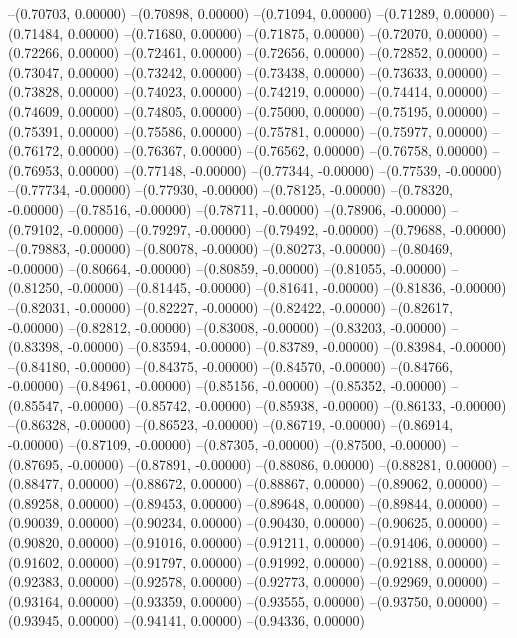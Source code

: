 --(0.70703, 0.00000)
--(0.70898, 0.00000)
--(0.71094, 0.00000)
--(0.71289, 0.00000)
--(0.71484, 0.00000)
--(0.71680, 0.00000)
--(0.71875, 0.00000)
--(0.72070, 0.00000)
--(0.72266, 0.00000)
--(0.72461, 0.00000)
--(0.72656, 0.00000)
--(0.72852, 0.00000)
--(0.73047, 0.00000)
--(0.73242, 0.00000)
--(0.73438, 0.00000)
--(0.73633, 0.00000)
--(0.73828, 0.00000)
--(0.74023, 0.00000)
--(0.74219, 0.00000)
--(0.74414, 0.00000)
--(0.74609, 0.00000)
--(0.74805, 0.00000)
--(0.75000, 0.00000)
--(0.75195, 0.00000)
--(0.75391, 0.00000)
--(0.75586, 0.00000)
--(0.75781, 0.00000)
--(0.75977, 0.00000)
--(0.76172, 0.00000)
--(0.76367, 0.00000)
--(0.76562, 0.00000)
--(0.76758, 0.00000)
--(0.76953, 0.00000)
--(0.77148, -0.00000)
--(0.77344, -0.00000)
--(0.77539, -0.00000)
--(0.77734, -0.00000)
--(0.77930, -0.00000)
--(0.78125, -0.00000)
--(0.78320, -0.00000)
--(0.78516, -0.00000)
--(0.78711, -0.00000)
--(0.78906, -0.00000)
--(0.79102, -0.00000)
--(0.79297, -0.00000)
--(0.79492, -0.00000)
--(0.79688, -0.00000)
--(0.79883, -0.00000)
--(0.80078, -0.00000)
--(0.80273, -0.00000)
--(0.80469, -0.00000)
--(0.80664, -0.00000)
--(0.80859, -0.00000)
--(0.81055, -0.00000)
--(0.81250, -0.00000)
--(0.81445, -0.00000)
--(0.81641, -0.00000)
--(0.81836, -0.00000)
--(0.82031, -0.00000)
--(0.82227, -0.00000)
--(0.82422, -0.00000)
--(0.82617, -0.00000)
--(0.82812, -0.00000)
--(0.83008, -0.00000)
--(0.83203, -0.00000)
--(0.83398, -0.00000)
--(0.83594, -0.00000)
--(0.83789, -0.00000)
--(0.83984, -0.00000)
--(0.84180, -0.00000)
--(0.84375, -0.00000)
--(0.84570, -0.00000)
--(0.84766, -0.00000)
--(0.84961, -0.00000)
--(0.85156, -0.00000)
--(0.85352, -0.00000)
--(0.85547, -0.00000)
--(0.85742, -0.00000)
--(0.85938, -0.00000)
--(0.86133, -0.00000)
--(0.86328, -0.00000)
--(0.86523, -0.00000)
--(0.86719, -0.00000)
--(0.86914, -0.00000)
--(0.87109, -0.00000)
--(0.87305, -0.00000)
--(0.87500, -0.00000)
--(0.87695, -0.00000)
--(0.87891, -0.00000)
--(0.88086, 0.00000)
--(0.88281, 0.00000)
--(0.88477, 0.00000)
--(0.88672, 0.00000)
--(0.88867, 0.00000)
--(0.89062, 0.00000)
--(0.89258, 0.00000)
--(0.89453, 0.00000)
--(0.89648, 0.00000)
--(0.89844, 0.00000)
--(0.90039, 0.00000)
--(0.90234, 0.00000)
--(0.90430, 0.00000)
--(0.90625, 0.00000)
--(0.90820, 0.00000)
--(0.91016, 0.00000)
--(0.91211, 0.00000)
--(0.91406, 0.00000)
--(0.91602, 0.00000)
--(0.91797, 0.00000)
--(0.91992, 0.00000)
--(0.92188, 0.00000)
--(0.92383, 0.00000)
--(0.92578, 0.00000)
--(0.92773, 0.00000)
--(0.92969, 0.00000)
--(0.93164, 0.00000)
--(0.93359, 0.00000)
--(0.93555, 0.00000)
--(0.93750, 0.00000)
--(0.93945, 0.00000)
--(0.94141, 0.00000)
--(0.94336, 0.00000)
